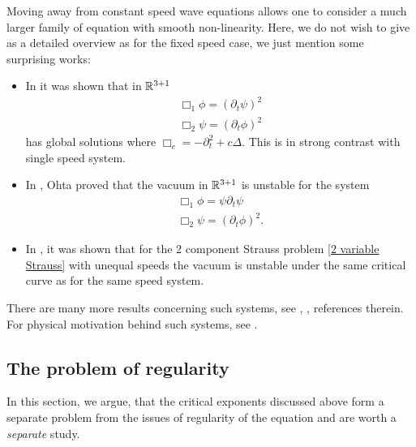 \documentclass[11pt, oneside]{amsart}
\begin{document}
	Moving away from constant speed wave equations allows one to consider a much larger family of equation with smooth non-linearity. Here, we do not wish to give as a detailed overview as for the fixed speed case, we just mention some surprising works:
	\begin{itemize}
		\item In \cite{yokoyama_global_2000} it was shown that in $\mathbb{R}^{3+1}$
		\begin{equation*}
			\begin{gathered}
				\Box_1\phi=(\partial_t\psi)^2\\
				\Box_2\psi=(\partial_t\phi)^2
			\end{gathered}
		\end{equation*}
		has global solutions where $\Box_c=-\partial_t^2+c\Delta$. This is in strong contrast with single speed system.
		\item In \cite{ohta_counterexample_2003}, Ohta proved that the vacuum in $\mathbb{R}^{3+1}$ is unstable for the system
		\begin{equation*}
			\begin{gathered}
				\Box_1\phi=\psi\partial_t\psi\\
				\Box_2\psi=(\partial_t\phi)^2.
			\end{gathered}
		\end{equation*}
		\item In \cite{kubo_small_2000}, it was shown that for the 2 component Strauss problem \eqref{2 variable Strauss} with unequal speeds the vacuum is unstable under the same critical curve as for the same speed system.
	\end{itemize}
	 There are many more results concerning such systems, see \cite{katayama_global_2006},  \cite{anderson_global_2021}, \cite{hidano_global_2022} references therein. For physical motivation behind such systems, see \cite{anderson_global_2021}.
	 
	\subsection{The problem of regularity}\label{regularity vs decay}
	In this section, we argue, that the critical exponents discussed above form a separate problem from the issues of regularity of the equation and are worth a \textit{separate} study.
	
\end{document}
